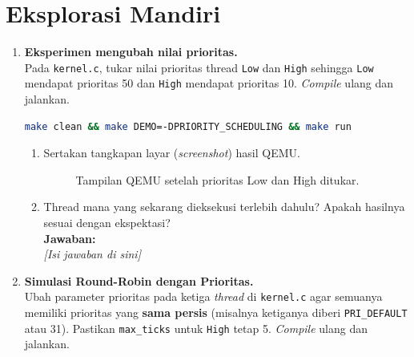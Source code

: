 \section{Eksplorasi Mandiri}

\begin{enumerate}

	\item \textbf{Eksperimen mengubah nilai prioritas.}\\
	      Pada \texttt{kernel.c}, tukar nilai prioritas thread \texttt{Low} dan \texttt{High} sehingga \texttt{Low} mendapat prioritas 50 dan \texttt{High} mendapat prioritas 10. \textit{Compile} ulang dan jalankan.

	      \begin{lstlisting}[language=bash, caption={Kompilasi untuk eksperimen tukar prioritas}]
make clean && make DEMO=-DPRIORITY_SCHEDULING && make run
    \end{lstlisting}

	      \begin{enumerate}
		      \item[(a)] Sertakan tangkapan layar (\textit{screenshot}) hasil QEMU.

		            \begin{figure}[H]
			            \centering
			            \caption{Tampilan QEMU setelah prioritas Low dan High ditukar.}
		            \end{figure}

		      \item[(b)] Thread mana yang sekarang dieksekusi terlebih dahulu? Apakah hasilnya sesuai dengan ekspektasi?\\[0.2cm]
		            \textbf{Jawaban:}\\
		            \textit{[Isi jawaban di sini]}
	      \end{enumerate}

	\item \textbf{Simulasi Round-Robin dengan Prioritas.}\\
	      Ubah parameter prioritas pada ketiga \textit{thread} di \texttt{kernel.c} agar semuanya memiliki prioritas yang \textbf{sama persis} (misalnya ketiganya diberi \texttt{PRI\_DEFAULT} atau 31). Pastikan \texttt{max\_ticks} untuk \texttt{High} tetap 5. \textit{Compile} ulang dan jalankan.


\end{enumerate}
